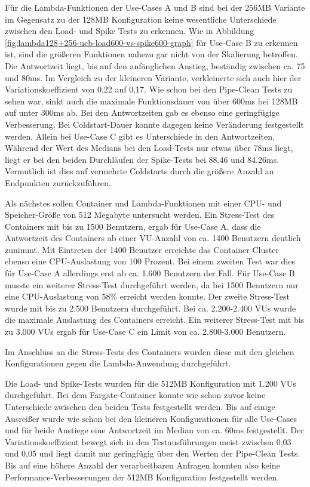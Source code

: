 Für die Lambda-Funktionen der Use-Cases A und B sind bei der 256MB Variante im Gegensatz zu der 128MB Konfiguration keine wesentliche Unterschiede zwischen den Load- und Spike Tests zu erkennen. Wie in Abbildung \ref{fig:lambda128+256-ucb-load600-vs-spike600-graph} für Use-Case B zu erkennen ist, sind die größeren Funktionen nahezu gar nicht von der Skalierung betroffen. Die Antwortzeit liegt, bis auf den anfänglichen Anstieg, beständig zwischen ca. 75 und 80ms. Im Vergleich zu der kleineren Variante, verkleinerte sich auch hier der Variationskoeffizient von 0,22 auf 0,17. Wie schon bei den Pipe-Clean Tests zu sehen war, sinkt auch die maximale Funktionsdauer von über 600ms bei 128MB auf unter 300ms ab. Bei den Antwortzeiten gab es ebenso eine geringfügige Verbesserung. Bei Coldstart-Dauer konnte dagegen keine Veränderung festgestellt werden.
Allein bei Use-Case C gibt es Unterschiede in den Antwortzeiten. Während der Wert des Medians bei den Load-Tests nur etwas über 78ms liegt, liegt er bei den beiden Durchläufen der Spike-Tests bei 88.46 und 84.26ms. Vermutlich ist dies auf vermehrte Coldstarts durch die größere Anzahl an Endpunkten zurückzuführen.


Als nächstes sollen Container und Lambda-Funktionen mit einer CPU- und Speicher-Größe von 512 Megabyte untersucht werden. Ein Stress-Test des Containers mit bis zu 1500 Benutzern, ergab für Use-Case A, dass die Antwortzeit des Containers ab einer VU-Anzahl von ca. 1400 Benutzern deutlich zunimmt. Mit Eintreten der 1400 Benutzer erreichte das Container Cluster ebenso eine CPU-Auslastung von 100 Prozent. Bei einem zweiten Test war dies für Use-Case A allerdings erst ab ca. 1.600 Benutzern der Fall. Für Use-Case B musste ein weiterer Stress-Test durchgeführt werden, da bei 1500 Benutzern nur eine CPU-Auslastung von 58\% erreicht werden konnte. Der zweite Stress-Test wurde mit bis zu 2.500 Benutzern durchgeführt. Bei ca. 2.200-2.400 VUs wurde die maximale Auslastung des Containers erreicht. Ein weiterer Stress-Test mit bis zu 3.000 VUs ergab für Use-Case C ein Limit von ca. 2.800-3.000 Benutzern.

Im Anschluss an die Stress-Tests des Containers wurden diese mit den gleichen Konfigurationen gegen die Lambda-Anwendung durchgeführt. 

Die Load- und Spike-Tests wurden für die 512MB Konfiguration mit 1.200 VUs durchgeführt. Bei dem Fargate-Container konnte wie schon zuvor keine Unterschiede zwischen den beiden Tests festgestellt werden. Bis auf einige Ausreißer wurde wie schon bei den kleineren Konfigurationen für alle Use-Cases und für beide Anstiege eine Antwortzeit im Median von ca. 60ms festgestellt. Der Variationskoeffizient bewegt sich in den Testausführungen meist zwischen 0,03 und 0,05 und liegt damit nur geringfügig über den Werten der Pipe-Clean Tests. Bis auf eine höhere Anzahl der verarbeitbaren Anfragen konnten also keine Performance-Verbesserungen der 512MB Konfiguration festgestellt werden.

